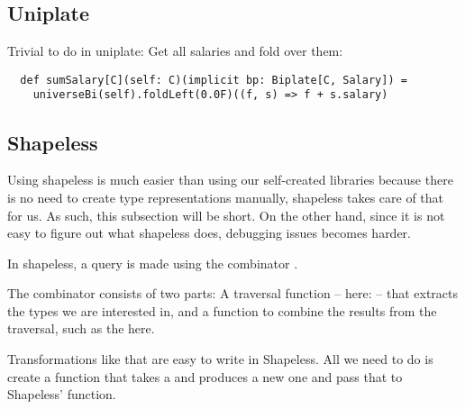 \subsection{Uniplate}


\begin{example}
 Trivial to do in uniplate: Get all salaries and fold over them:
\begin{lstlisting}
  def sumSalary[C](self: C)(implicit bp: Biplate[C, Salary]) =
    universeBi(self).foldLeft(0.0F)((f, s) => f + s.salary)
\end{lstlisting}

\end{example}

\begin{example}
\end{example}


\subsection{Shapeless}

Using shapeless is much easier than using our self-created libraries because
there is no need to create type representations manually, shapeless takes care
of that for us. As such, this subsection will be short. On the other hand, since
it is not easy to figure out what shapeless does, debugging issues becomes
harder.

\begin{example}
In shapeless, a query is made using the combinator .



The  combinator consists of two parts: A traversal function
-- here:  -- that extracts the types we are interested in,
and a function to combine the results from the traversal, such as the
 here.
\end{example}

\begin{example}

Transformations like that are easy to write in Shapeless. All we need to do
is create a function that takes a  and produces a new one and pass
that to Shapeless'  function.



\end{example}
